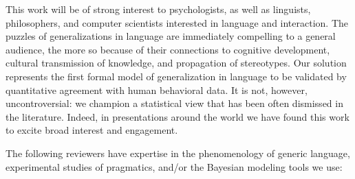 \documentclass[11pt,letterpaper]{letter} %
\begin{document}
\begin{letter}



This work will be of strong interest to psychologists, as well as linguists, philosophers, and computer scientists interested in language and interaction.
The puzzles of generalizations in language are immediately compelling to a general audience, the more so because of their connections to cognitive development, cultural transmission of knowledge, and propagation of stereotypes.
Our solution represents the first formal model of generalization in language to be validated by quantitative agreement with human behavioral data.
It is not, however, uncontroversial: we champion a statistical view that has been often dismissed in the literature.
Indeed, in presentations around the world we have found this work to excite broad interest and engagement.

The following reviewers have expertise in the phenomenology of generic language, experimental studies of pragmatics, and/or the Bayesian modeling tools we use:


\end{letter}
\end{document}
